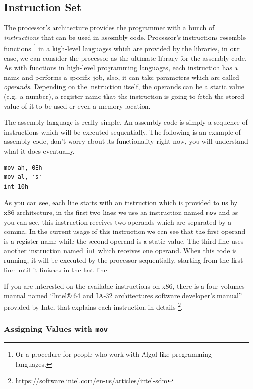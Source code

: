 \subsection{Instruction Set}\label{instruction-set}

The processor's architecture provides the programmer with a bunch of
\emph{instructions} that can be used in assembly code. Processor's
instructions resemble functions \footnote{Or a procedure for people who
  work with Algol-like programming languages.} in a high-level languages
which are provided by the libraries, in our case, we can consider the
processor as the ultimate library for the assembly code. As with
functions in high-level programming languages, each instruction has a
name and performs a specific job, also, it can take parameters which are
called \emph{operands}. Depending on the instruction itself, the
operands can be a static value (e.g.~a number), a register name that the
instruction is going to fetch the stored value of it to be used or even
a memory location.

The assembly language is really simple. An assembly code is simply a
sequence of instructions which will be executed sequentially. The
following is an example of assembly code, don't worry about its
functionality right now, you will understand what it does eventually.

\begin{lstlisting}
mov ah, 0Eh
mov al, 's' 
int 10h
\end{lstlisting}

As you can see, each line starts with an instruction which is provided
to us by x86 architecture, in the first two lines we use an instruction
named \lstinline!mov! and as you can see, this instruction receives two
operands which are separated by a comma. In the current usage of this
instruction we can see that the first operand is a register name while
the second operand is a static value. The third line uses another
instruction named \lstinline!int! which receives one operand. When this
code is running, it will be executed by the processor sequentially,
starting from the first line until it finishes in the last line.

If you are interested on the available instructions on x86, there is a
four-volumes manual named ``Intel® 64 and IA-32 architectures software
developer's manual'' provided by Intel that explains each instruction in
details \footnote{\url{https://software.intel.com/en-us/articles/intel-sdm}}.

\subsubsection{\texorpdfstring{Assigning Values with
\texttt{mov}}{Assigning Values with mov}}\label{assigning-values-with-mov}

